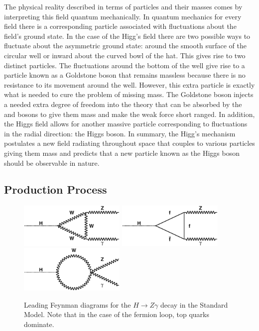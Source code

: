 The physical reality described in terms of particles and their masses comes 
by interpreting this field quantum mechanically.
In quantum mechanics for every field there is a
corresponding particle associated with fluctuations about the field's ground
state. In the case of the Higg's field there are two possible ways to fluctuate
about the asymmetric ground state: around the smooth surface of the circular well
or inward about the curved bowl of the hat. This gives rise to two distinct 
particles. The fluctuations around the bottom of the well give rise to a particle 
known as a Goldstone boson that remains massless because there is no resistance
to its movement around the well. However, this extra particle is exactly what
is needed to cure the problem of missing mass. The Goldstone boson injects
a needed extra degree of freedom into the theory
that can be absorbed by the \WBosons and \ZBoson
bosons to give them mass and make the weak force short ranged. In addition, 
the Higgs field allows for
another massive particle corresponding to fluctuations in the radial
direction: the Higgs boson. In summary, the Higg's mechanism postulates a new field
radiating throughout space that couples to various particles giving them mass
and predicts that a new particle known as the Higgs boson should be observable
in nature.


\subsection{Production Process}
\label{subsec:prodproc}

\begin{figure}[!htbp]
  \begin{center}
  {\includegraphics[width=2in]{figures/loop1}}
  {\includegraphics[width=2in]{figures/loop2}}
  {\includegraphics[width=2in]{figures/loop3}}
  \caption{Leading Feynman diagrams for the $H\rightarrow Z\gamma$
    decay in the Standard Model. Note that in the case of the fermion
    loop, top quarks dominate.} 
  \label{fig:feynman}
  \end{center}
\end{figure}
